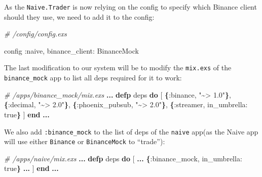 \documentclass[
  oneside]{book}
\newenvironment{Shaded}{\begin{snugshade}}{\end{snugshade}}
\newcommand{\CommentTok}[1]{\textcolor[rgb]{0.56,0.35,0.01}{\textit{#1}}}
\newcommand{\ConstantTok}[1]{\textcolor[rgb]{0.56,0.35,0.01}{#1}}
\newcommand{\FunctionTok}[1]{\textcolor[rgb]{0.13,0.29,0.53}{\textbf{#1}}}
\newcommand{\KeywordTok}[1]{\textcolor[rgb]{0.13,0.29,0.53}{\textbf{#1}}}
\newcommand{\NormalTok}[1]{#1}
\newcommand{\OperatorTok}[1]{\textcolor[rgb]{0.81,0.36,0.00}{\textbf{#1}}}
\newcommand{\OtherTok}[1]{\textcolor[rgb]{0.56,0.35,0.01}{#1}}
\newcommand{\StringTok}[1]{\textcolor[rgb]{0.31,0.60,0.02}{#1}}
\newcommand{\VariableTok}[1]{\textcolor[rgb]{0.00,0.00,0.00}{#1}}
\begin{document}
\newpage

As the \texttt{Naive.Trader} is now relying on the config to specify which Binance client should they use, we need to add it to the config:

\begin{Shaded}
\begin{Highlighting}[]
\CommentTok{\# /config/config.exs}

\NormalTok{config }\VariableTok{:naive}\NormalTok{,}
  \VariableTok{binance\_client:} \ConstantTok{BinanceMock}
\end{Highlighting}
\end{Shaded}

The last modification to our system will be to modify the \texttt{mix.exs} of the \texttt{binance\_mock} app to list all deps required for it to work:

\begin{Shaded}
\begin{Highlighting}[]
\CommentTok{\# /apps/binance\_mock/mix.exs}
\OperatorTok{...}
  \KeywordTok{defp}\NormalTok{ deps }\KeywordTok{do}
    \OtherTok{[}
      \FunctionTok{\{}\VariableTok{:binance}\NormalTok{, }\StringTok{"\textasciitilde{}\textgreater{} 1.0"}\FunctionTok{\}}\NormalTok{,}
      \FunctionTok{\{}\VariableTok{:decimal}\NormalTok{, }\StringTok{"\textasciitilde{}\textgreater{} 2.0"}\FunctionTok{\}}\NormalTok{,}
      \FunctionTok{\{}\VariableTok{:phoenix\_pubsub}\NormalTok{, }\StringTok{"\textasciitilde{}\textgreater{} 2.0"}\FunctionTok{\}}\NormalTok{,}
      \FunctionTok{\{}\VariableTok{:streamer}\NormalTok{, }\VariableTok{in\_umbrella:} \ConstantTok{true}\FunctionTok{\}}
    \OtherTok{]}
  \KeywordTok{end}
\OperatorTok{...}
\end{Highlighting}
\end{Shaded}

We also add \texttt{:binance\_mock} to the list of deps of the \texttt{naive} app(as the Naive app will use either \texttt{Binance} or \texttt{BinanceMock} to ``trade''):

\begin{Shaded}
\begin{Highlighting}[]
\CommentTok{\# /apps/naive/mix.exs}
\OperatorTok{...}
  \KeywordTok{defp}\NormalTok{ deps }\KeywordTok{do}
    \OtherTok{[}
      \OperatorTok{...}
      \FunctionTok{\{}\VariableTok{:binance\_mock}\NormalTok{, }\VariableTok{in\_umbrella:} \ConstantTok{true}\FunctionTok{\}}
      \OperatorTok{...}
    \OtherTok{]}
  \KeywordTok{end}
\OperatorTok{...}
\end{Highlighting}
\end{Shaded}
\end{document}
